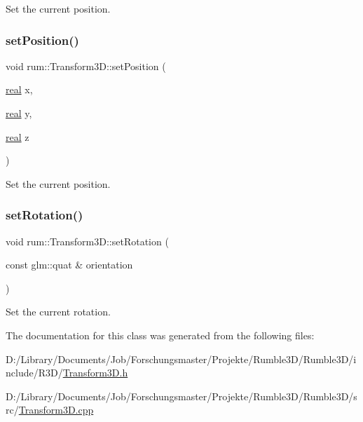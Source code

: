 Set the current position. \mbox{\label{classrum_1_1_transform3_d_a03f1b94bd0036915b4062e763850a35f}} 
\subsubsection{\texorpdfstring{set\+Position()}{setPosition()}\hspace{0.1cm}{\footnotesize\ttfamily [2/2]}}
{\footnotesize\ttfamily void rum\+::\+Transform3\+D\+::set\+Position (\begin{DoxyParamCaption}\item[{\mbox{\hyperlink{namespacerum_a7e8cca23573d5eaead0f138cbaa4862c}{real}}}]{x,  }\item[{\mbox{\hyperlink{namespacerum_a7e8cca23573d5eaead0f138cbaa4862c}{real}}}]{y,  }\item[{\mbox{\hyperlink{namespacerum_a7e8cca23573d5eaead0f138cbaa4862c}{real}}}]{z }\end{DoxyParamCaption})}

Set the current position. \mbox{\label{classrum_1_1_transform3_d_a962ea9ec2f40d9a6928091297f9dea0f}} 
\subsubsection{\texorpdfstring{set\+Rotation()}{setRotation()}}
{\footnotesize\ttfamily void rum\+::\+Transform3\+D\+::set\+Rotation (\begin{DoxyParamCaption}\item[{const glm\+::quat \&}]{orientation }\end{DoxyParamCaption})}

Set the current rotation. 

The documentation for this class was generated from the following files\+:\begin{DoxyCompactItemize}
\item 
D\+:/\+Library/\+Documents/\+Job/\+Forschungsmaster/\+Projekte/\+Rumble3\+D/\+Rumble3\+D/include/\+R3\+D/\mbox{\hyperlink{_transform3_d_8h}{Transform3\+D.\+h}}\item 
D\+:/\+Library/\+Documents/\+Job/\+Forschungsmaster/\+Projekte/\+Rumble3\+D/\+Rumble3\+D/src/\mbox{\hyperlink{_transform3_d_8cpp}{Transform3\+D.\+cpp}}\end{DoxyCompactItemize}

